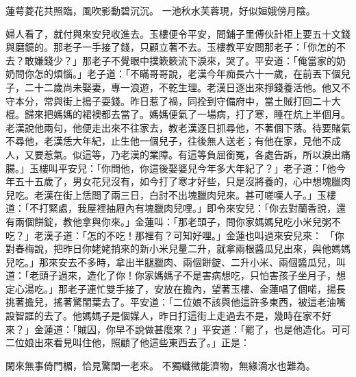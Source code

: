 蓮萼菱花共照臨，風吹影動碧沉沉。
一池秋水芙蓉現，好似姮娥傍月陰。

婦人看了，就付與來安兒收進去。玉樓便令平安，問鋪子里傅伙計柜上要五十文錢與磨鏡的。那老子一手接了錢，只顧立著不去。玉樓教平安問那老子：「你怎的不去？敢嫌錢少？」那老子不覺眼中撲簌簌流下淚來，哭了。平安道：「俺當家的奶奶問你怎的煩惱。」老子道：「不瞞哥哥說，老漢今年痴長六十一歲，在前丟下個兒子，二十二歲尚未娶妻，專一浪遊，不乾生理。老漢日逐出來掙錢養活他。他又不守本分，常與街上搗子耍錢。昨日惹了禍，同拴到守備府中，當土賊打回二十大棍。歸來把媽媽的裙襖都去當了。媽媽便氣了一場病，打了寒，睡在炕上半個月。老漢說他兩句，他便走出來不往家去，教老漢逐日抓尋他，不著個下落。待要賭氣不尋他，老漢恁大年紀，止生他一個兒子，往後無人送老；有他在家，見他不成人，又要惹氣。似這等，乃老漢的業障。有這等負屈銜冤，各處告訴，所以淚出痛腸。」玉樓叫平安兒：「你問他，你這後娶婆兒今年多大年紀了？」老子道：「他今年五十五歲了，男女花兒沒有，如今打了寒才好些，只是沒將養的，心中想塊臘肉兒吃。老漢在街上恁問了兩三日，白討不出塊臘肉兒來。甚可嗟嘆人子。」玉樓道：「不打緊處，我屋裡抽屜內有塊臘肉兒哩。」即令來安兒：「你去對蘭香說，還有兩個餅錠，教他拿與你來。」金蓮叫：「那老頭子，問你家媽媽兒吃小米兒粥不吃？」老漢子道：「怎的不吃！那裡有？可知好哩。」金蓮也叫過來安兒來： 「你對春梅說，把昨日你姥姥捎來的新小米兒量二升，就拿兩根醬瓜兒出來，與他媽媽兒吃。」那來安去不多時，拿出半腿臘肉、兩個餅錠、二升小米、兩個醬瓜兒，叫道：「老頭子過來，造化了你！你家媽媽子不是害病想吃，只怕害孩子坐月子，想定心湯吃。」那老子連忙雙手接了，安放在擔內，望著玉樓、金蓮唱了個喏，揚長挑著擔兒，搖著驚閨葉去了。平安道：「二位娘不該與他這許多東西，被這老油嘴設智誆的去了。他媽媽子是個媒人，昨日打這街上走過去不是，幾時在家不好來？」金蓮道：「賊囚，你早不說做甚麼來？」平安道：「罷了，也是他造化。可可二位娘出來看見叫住他，照顧了他這些東西去了。」正是：

閑來無事倚門楣，恰見驚閨一老來。
不獨纖微能濟物，無緣滴水也難為。

